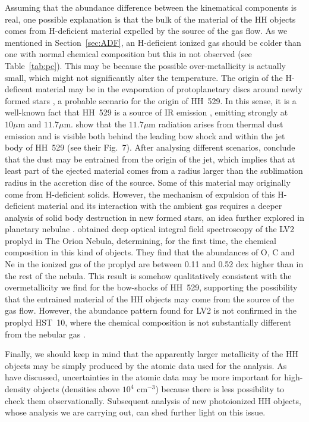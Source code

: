 \documentclass[fleqn,usenatbib]{mnras}
\begin{document}
Assuming that the abundance difference between the kinematical components is real, one possible explanation is that the bulk of the material of the HH objects comes from H-deficient material expelled by the source of the gas flow. As we mentioned in Section~\ref{sec:ADF}, an H-deficient ionized gas should be colder than one with normal chemical composition but this in not observed (see Table~\ref{tab:pc}). This may be because the possible over-metallicity is actually small, which might not significantly alter the temperature. The origin of the H-deficent material may be in the evaporation of protoplanetary discs around newly formed stars \citep{yuan11}, a probable scenario for the origin of HH~529. In this sense, it is a well-known fact that HH~529 is a source of IR emission \citep{Robberto05,smith05}, emitting strongly at $10\mu \text{m}$ and $11.7\mu \text{m}$. \citet{smith05} show that the $11.7\mu \text{m}$ radiation arises from thermal dust emission and is visible both behind the leading bow shock and within the jet body of HH~529 (see their Fig.~7). After analysing different scenarios, \citet{smith05} conclude that the dust may be entrained from the origin of the jet, which implies that at least part of the ejected material comes from a radius larger than the sublimation radius in the accretion disc of the source. Some of this material may originally come from H-deficient solids. However, the mechanism of expulsion of this H-deficient material and its interaction with the ambient gas requires a deeper analysis of solid body destruction in new formed stars, an idea further explored in planetary nebulae \citep{henney10}. \citet{tsamis11} obtained deep optical integral field spectroscopy of the LV2 proplyd in The Orion Nebula, determining, for the first time, the chemical composition in this kind of objects. They find that the abundances of O, C and Ne in the ionized gas of the proplyd are between 0.11 and 0.52 dex higher than in the rest of the nebula. This result is somehow qualitatively consistent with the overmetallicity we find for the bow-shocks of HH~529, supporting the possibility that the entrained material of the HH objects may come from the source of the gas flow. However, the abundance pattern found for LV2 is not confirmed in the proplyd HST~10, where the chemical composition is not substantially different from the nebular gas \citep{tsamis13}. 

 Finally, we should keep in mind that the apparently larger metallicity of the HH objects may be simply produced by the atomic data used for the analysis. As \citet{JuandeDios17} have discussed, uncertainties in the atomic data may be more important for high-density objects (densities above $10^4\text{ cm}^{-3}$) because there is less possibility to check them observationally. Subsequent analysis of new photoionized HH objects, whose analysis we are carrying out, can shed further light on this issue.
\end{document}
